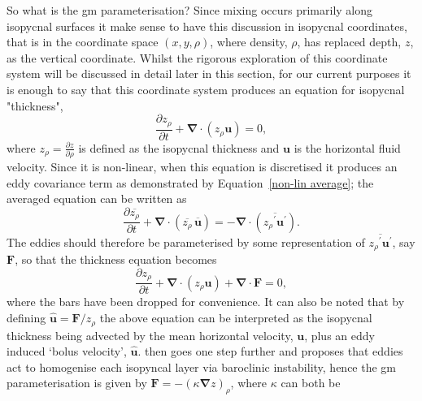 \documentclass[10pt,a4paper]{article}
\newcommand*\mean[1]{\overline{#1}}
\newcommand*\res[1]{{#1}^{\prime}}
\newcommand*\equref[1]{Equation~\ref{#1}}
\begin{document}
 So what is the \gls{gm} parameterisation? Since mixing occurs primarily
 along isopycnal surfaces it make sense to have this discussion in
 isopycnal coordinates, that is in the coordinate space $(x,y,\rho)$,
  where density, $\rho$, has replaced depth, $z$, as the vertical
  coordinate. Whilst the rigorous exploration of this coordinate system
  will be discussed in detail later in this section, for our current purposes 
  it is enough to say that this coordinate system produces an equation
  for isopycnal "thickness",
  \begin{equation}
  \label{cont}
  \frac{\partial z_{\rho}}{\partial t} + \boldsymbol{\nabla}\cdot\left(z_{\rho}\boldsymbol{u}\right) = 0,
  \end{equation}
  where $z_{\rho} = \frac{\partial z}{\partial \rho}$ is defined as the
   isopycnal thickness and $\boldsymbol{u}$ is the horizontal fluid
   velocity. Since it is non-linear, when this equation is discretised
   it produces an eddy covariance term as demonstrated by 
   \equref{non-lin average}; the averaged equation can be written as
     \begin{equation}
     \frac{\partial \mean{z_{\rho}}}{\partial t} + \boldsymbol{\nabla}\cdot\left(\mean{z_{\rho}} \, \mean{\boldsymbol{u}}\right) = - \boldsymbol{\nabla}\cdot\left(\mean{\res{z_{\rho}} \res{\boldsymbol{u}}}\right).
     \label{meancont}
     \end{equation}
   The eddies should therefore be parameterised by some representation
   of $\mean{\res{z_{\rho}} \res{\boldsymbol{u}}}$, say $\boldsymbol{F}$,
   so that the thickness equation becomes
     \begin{equation}
     \frac{\partial z_{\rho}}{\partial t} + \boldsymbol{\nabla}\cdot\left(z_{\rho}\boldsymbol{u}\right) + \boldsymbol{\nabla}\cdot\boldsymbol{F} = 0,
     \label{thicknessgeneralparam}
     \end{equation}
    where the bars have been dropped for convenience. It can also 
    be noted that by defining $\hat{\boldsymbol{u}} = \boldsymbol{F}/z_{\rho}$ the above equation can be interpreted as
    the isopycnal thickness
    being advected by the mean horizontal velocity, $\boldsymbol{u}$, 
    plus an eddy induced
    `bolus velocity', $\hat{\boldsymbol{u}}$. \cite{gent1990} then goes one
    step further and proposes that eddies act to homogenise each
    isopyncal layer via baroclinic instability, hence the 
    \gls{gm} parameterisation is given by $\boldsymbol{F} = - \left(\kappa
    \boldsymbol{\nabla} z \right)_{\rho}$, where $\kappa$ can both be
\end{document}
